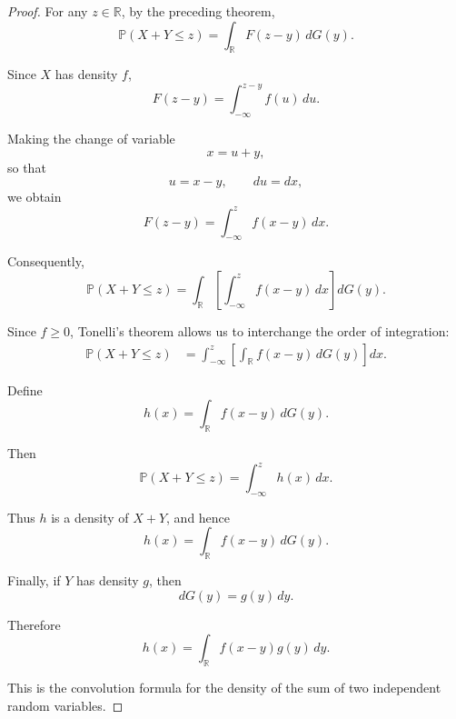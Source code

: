 \begin{proof}

For any $z\in\mathbb{R}$, by the preceding theorem,
\[
\mathbb{P}(X+Y\leq z)
=
\int_{\mathbb{R}}F(z-y)\,dG(y).
\]

Since $X$ has density $f$,
\[
F(z-y)
=
\int_{-\infty}^{z-y}f(u)\,du.
\]

Making the change of variable
\[
x=u+y,
\]
so that
\[
u=x-y,
\qquad
du=dx,
\]
we obtain
\[
F(z-y)
=
\int_{-\infty}^{z}f(x-y)\,dx.
\]

Consequently,
\[
\mathbb{P}(X+Y\leq z)
=
\int_{\mathbb{R}}
\left[
\int_{-\infty}^{z}
f(x-y)\,dx
\right]dG(y).
\]

Since $f\geq0$, Tonelli's theorem allows us to interchange the
order of integration:
\[
\begin{aligned}
\mathbb{P}(X+Y\leq z)
&=
\int_{-\infty}^{z}
\left[
\int_{\mathbb{R}}
f(x-y)\,dG(y)
\right]dx.
\end{aligned}
\]

Define
\[
h(x)
=
\int_{\mathbb{R}}
f(x-y)\,dG(y).
\]

Then
\[
\mathbb{P}(X+Y\leq z)
=
\int_{-\infty}^{z}h(x)\,dx.
\]

Thus $h$ is a density of $X+Y$, and hence
\[
\boxed{
h(x)
=
\int_{\mathbb{R}}f(x-y)\,dG(y).
}
\]

Finally, if $Y$ has density $g$, then
\[
dG(y)=g(y)\,dy.
\]

Therefore
\[
\boxed{
h(x)
=
\int_{\mathbb{R}}f(x-y)g(y)\,dy.
}
\]

This is the convolution formula for the density of the sum of two
independent random variables.

\end{proof}



\lectureend
